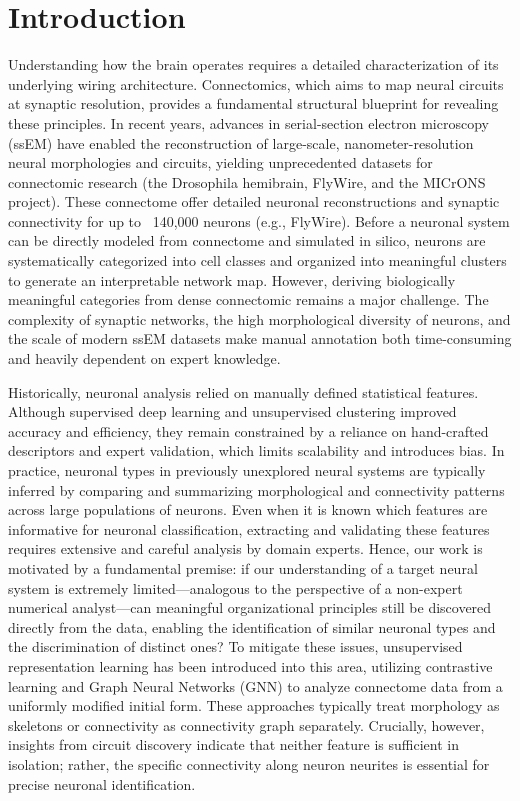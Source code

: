 \documentclass{article}
\begin{document}
\section{Introduction}
Understanding how the brain operates requires a detailed characterization of its underlying wiring architecture. Connectomics, which aims to map neural circuits at synaptic resolution, provides a fundamental structural blueprint for revealing these principles. 
In recent years, advances in serial-section electron microscopy (ssEM) have enabled the reconstruction of large-scale, nanometer-resolution neural morphologies and circuits, yielding unprecedented datasets for connectomic research (the Drosophila hemibrain, FlyWire, and the MICrONS project). These connectome offer detailed neuronal reconstructions and synaptic connectivity for up to ~140,000 neurons (e.g., FlyWire). 
Before a neuronal system can be directly modeled from connectome and simulated in silico, neurons are systematically categorized into cell classes and organized into meaningful clusters to generate an interpretable network map. However, deriving biologically meaningful categories from dense connectomic remains a major challenge. The complexity of synaptic networks, the high morphological diversity of neurons, and the scale of modern ssEM datasets make manual annotation both time-consuming and heavily dependent on expert knowledge.

Historically, neuronal analysis relied on manually defined statistical features. Although supervised deep learning and unsupervised clustering improved accuracy and efficiency, they remain constrained by a reliance on hand-crafted descriptors and expert validation, which limits scalability and introduces bias. 
In practice, neuronal types in previously unexplored neural systems are typically inferred by comparing and summarizing morphological and connectivity patterns across large populations of neurons. Even when it is known which features are informative for neuronal classification, extracting and validating these features requires extensive and careful analysis by domain experts. Hence, our work is motivated by a fundamental premise: if our understanding of a target neural system is extremely limited—analogous to the perspective of a non-expert numerical analyst—can meaningful organizational principles still be discovered directly from the data, enabling the identification of similar neuronal types and the discrimination of distinct ones?
To mitigate these issues, unsupervised representation learning has been introduced into this area, utilizing contrastive learning and Graph Neural Networks (GNN) to analyze connectome data from a uniformly modified initial form. These approaches typically treat morphology as skeletons or connectivity as connectivity graph separately. Crucially, however, insights from circuit discovery indicate that neither feature is sufficient in isolation; rather, the specific connectivity along neuron neurites is essential for precise neuronal identification.
\end{document}
